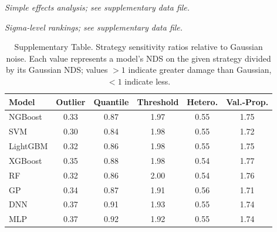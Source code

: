 \documentclass[pdflatex,sn-mathphys-num]{sn-jnl}%
\theoremstyle{thmstyleone}%
\theoremstyle{thmstyletwo}%
\theoremstyle{thmstylethree}%
\begin{document}
\begin{appendices}
\begin{table}[h]
\centering
\caption{Supplementary Table. Simple effects analysis: $\eta^2$ for model architecture within each representation level, and vice versa, by noise strategy. Available as \texttt{table1\_supp\_simple\_effects.csv}.}
\label{tab:simple_effects}
\small
\textit{Simple effects analysis; see supplementary data file.}
\end{table}

\begin{table}[h]
\centering
\caption{Supplementary Table. Model rankings at each noise level on PDV (Gaussian strategy), showing how relative model performance changes as noise increases. Available as \texttt{table5\_sigma\_rankings.csv}.}
\label{tab:sigma_rankings}
\small
\textit{Sigma-level rankings; see supplementary data file.}
\end{table}

\begin{table}[h]
\centering
\caption{Supplementary Table. Strategy sensitivity ratios relative to Gaussian noise. Each value represents a model's NDS on the given strategy divided by its Gaussian NDS; values $> 1$ indicate greater damage than Gaussian, $< 1$ indicate less.}
\label{tab:supp_sensitivity_ratios}
\small
\begin{tabular}{lccccc}
\toprule
\textbf{Model} & \textbf{Outlier} & \textbf{Quantile} & \textbf{Threshold} & \textbf{Hetero.} & \textbf{Val.-Prop.} \\
\midrule
NGBoost  & 0.33 & 0.87 & 1.97 & 0.55 & 1.75 \\
SVM      & 0.30 & 0.84 & 1.98 & 0.55 & 1.72 \\
LightGBM & 0.32 & 0.86 & 1.98 & 0.55 & 1.75 \\
XGBoost  & 0.35 & 0.88 & 1.98 & 0.54 & 1.77 \\
RF       & 0.32 & 0.86 & 2.00 & 0.54 & 1.76 \\
GP       & 0.34 & 0.87 & 1.91 & 0.56 & 1.71 \\
DNN      & 0.37 & 0.91 & 1.93 & 0.55 & 1.74 \\
MLP      & 0.37 & 0.92 & 1.92 & 0.55 & 1.74 \\
\bottomrule
\end{tabular}
\end{table}


\end{appendices}
\end{document}
